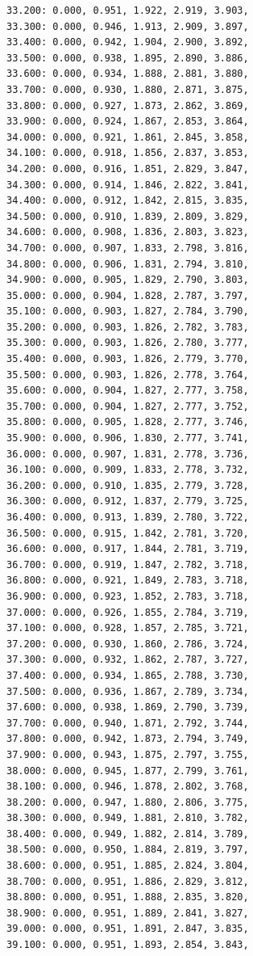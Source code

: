 \documentclass[12pt, a4paper]{article}
\begin{document}
\begin{scriptsize}
\begin{ttfamily}
\begin{lstlisting}
33.200: 0.000, 0.951, 1.922, 2.919, 3.903, 
33.300: 0.000, 0.946, 1.913, 2.909, 3.897, 
33.400: 0.000, 0.942, 1.904, 2.900, 3.892, 
33.500: 0.000, 0.938, 1.895, 2.890, 3.886, 
33.600: 0.000, 0.934, 1.888, 2.881, 3.880, 
33.700: 0.000, 0.930, 1.880, 2.871, 3.875, 
33.800: 0.000, 0.927, 1.873, 2.862, 3.869, 
33.900: 0.000, 0.924, 1.867, 2.853, 3.864, 
34.000: 0.000, 0.921, 1.861, 2.845, 3.858, 
34.100: 0.000, 0.918, 1.856, 2.837, 3.853, 
34.200: 0.000, 0.916, 1.851, 2.829, 3.847, 
34.300: 0.000, 0.914, 1.846, 2.822, 3.841, 
34.400: 0.000, 0.912, 1.842, 2.815, 3.835, 
34.500: 0.000, 0.910, 1.839, 2.809, 3.829, 
34.600: 0.000, 0.908, 1.836, 2.803, 3.823, 
34.700: 0.000, 0.907, 1.833, 2.798, 3.816, 
34.800: 0.000, 0.906, 1.831, 2.794, 3.810, 
34.900: 0.000, 0.905, 1.829, 2.790, 3.803, 
35.000: 0.000, 0.904, 1.828, 2.787, 3.797, 
35.100: 0.000, 0.903, 1.827, 2.784, 3.790, 
35.200: 0.000, 0.903, 1.826, 2.782, 3.783, 
35.300: 0.000, 0.903, 1.826, 2.780, 3.777, 
35.400: 0.000, 0.903, 1.826, 2.779, 3.770, 
35.500: 0.000, 0.903, 1.826, 2.778, 3.764, 
35.600: 0.000, 0.904, 1.827, 2.777, 3.758, 
35.700: 0.000, 0.904, 1.827, 2.777, 3.752, 
35.800: 0.000, 0.905, 1.828, 2.777, 3.746, 
35.900: 0.000, 0.906, 1.830, 2.777, 3.741, 
36.000: 0.000, 0.907, 1.831, 2.778, 3.736, 
36.100: 0.000, 0.909, 1.833, 2.778, 3.732, 
36.200: 0.000, 0.910, 1.835, 2.779, 3.728, 
36.300: 0.000, 0.912, 1.837, 2.779, 3.725, 
36.400: 0.000, 0.913, 1.839, 2.780, 3.722, 
36.500: 0.000, 0.915, 1.842, 2.781, 3.720, 
36.600: 0.000, 0.917, 1.844, 2.781, 3.719, 
36.700: 0.000, 0.919, 1.847, 2.782, 3.718, 
36.800: 0.000, 0.921, 1.849, 2.783, 3.718, 
36.900: 0.000, 0.923, 1.852, 2.783, 3.718, 
37.000: 0.000, 0.926, 1.855, 2.784, 3.719, 
37.100: 0.000, 0.928, 1.857, 2.785, 3.721, 
37.200: 0.000, 0.930, 1.860, 2.786, 3.724, 
37.300: 0.000, 0.932, 1.862, 2.787, 3.727, 
37.400: 0.000, 0.934, 1.865, 2.788, 3.730, 
37.500: 0.000, 0.936, 1.867, 2.789, 3.734, 
37.600: 0.000, 0.938, 1.869, 2.790, 3.739, 
37.700: 0.000, 0.940, 1.871, 2.792, 3.744, 
37.800: 0.000, 0.942, 1.873, 2.794, 3.749, 
37.900: 0.000, 0.943, 1.875, 2.797, 3.755, 
38.000: 0.000, 0.945, 1.877, 2.799, 3.761, 
38.100: 0.000, 0.946, 1.878, 2.802, 3.768, 
38.200: 0.000, 0.947, 1.880, 2.806, 3.775, 
38.300: 0.000, 0.949, 1.881, 2.810, 3.782, 
38.400: 0.000, 0.949, 1.882, 2.814, 3.789, 
38.500: 0.000, 0.950, 1.884, 2.819, 3.797, 
38.600: 0.000, 0.951, 1.885, 2.824, 3.804, 
38.700: 0.000, 0.951, 1.886, 2.829, 3.812, 
38.800: 0.000, 0.951, 1.888, 2.835, 3.820, 
38.900: 0.000, 0.951, 1.889, 2.841, 3.827, 
39.000: 0.000, 0.951, 1.891, 2.847, 3.835, 
39.100: 0.000, 0.951, 1.893, 2.854, 3.843, 

\end{lstlisting}
\end{ttfamily}
\end{scriptsize}
\end{document}
